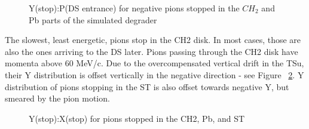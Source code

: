 \begin{figure}[H]
  \caption{
    \label{figure:y_vs_p_deg}
    Y(stop):P\@(DS entrance) for negative pions stopped in the $CH_2$ and Pb parts of the simulated degrader
  }
\end{figure}

The slowest, least energetic, pions stop in the CH2 disk. In most cases, those are also the ones arriving
to the DS later. Pions passing through the CH2 disk have momenta above 60 MeV/c. Due to the overcompensated
vertical drift in the TSu, their Y distribution is offset vertically in the negative direction -
see Figure ~\ref{figure:y_vs_x_st}. Y distribution of pions stopping in the ST is also offset towards
negative Y, but smeared by the pion motion.

\begin{figure}[H]
  \caption{
    \label{figure:y_vs_x_st}
    Y(stop):X(stop) for pions stopped in the CH2, Pb, and ST
  }
\end{figure}



